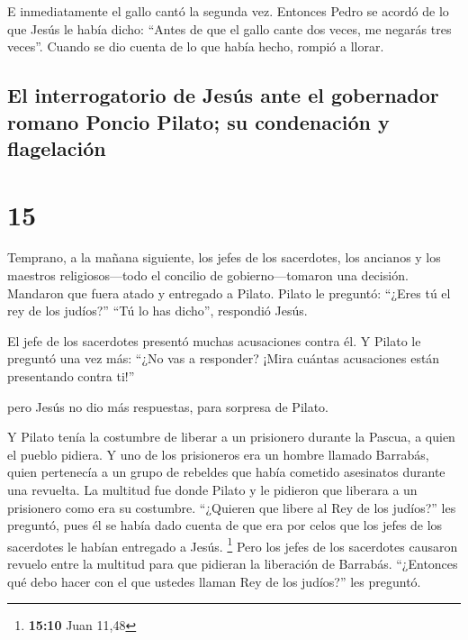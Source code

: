  E inmediatamente el gallo cantó la segunda vez. Entonces
Pedro se acordó de lo que Jesús le había dicho: ``Antes de que el gallo
cante dos veces, me negarás tres veces''. Cuando se dio cuenta de lo que
había hecho, rompió a llorar.

\hypertarget{el-interrogatorio-de-jesuxfas-ante-el-gobernador-romano-poncio-pilato-su-condenaciuxf3n-y-flagelaciuxf3n}{%
\subsection{El interrogatorio de Jesús ante el gobernador romano Poncio
Pilato; su condenación y
flagelación}\label{el-interrogatorio-de-jesuxfas-ante-el-gobernador-romano-poncio-pilato-su-condenaciuxf3n-y-flagelaciuxf3n}}

\hypertarget{section-14}{%
\section{15}\label{section-14}}

 Temprano, a la mañana siguiente, los jefes de los
sacerdotes, los ancianos y los maestros religiosos---todo el concilio de
gobierno---tomaron una decisión. Mandaron que fuera atado y entregado a
Pilato.  Pilato le preguntó: ``¿Eres tú el rey de los
judíos?'' ``Tú lo has dicho'', respondió Jesús.

 El jefe de los sacerdotes presentó muchas acusaciones
contra él.  Y Pilato le preguntó una vez más: ``¿No vas a
responder? ¡Mira cuántas acusaciones están presentando contra ti!''

 pero Jesús no dio más respuestas, para sorpresa de
Pilato.

 Y Pilato tenía la costumbre de liberar a un prisionero
durante la Pascua, a quien el pueblo pidiera.  Y uno de
los prisioneros era un hombre llamado Barrabás, quien pertenecía a un
grupo de rebeldes que había cometido asesinatos durante una revuelta.
 La multitud fue donde Pilato y le pidieron que liberara a
un prisionero como era su costumbre.  ``¿Quieren que
libere al Rey de los judíos?'' les preguntó,  pues él se
había dado cuenta de que era por celos que los jefes de los sacerdotes
le habían entregado a Jesús. \footnote{\textbf{15:10} Juan 11,48}
 Pero los jefes de los sacerdotes causaron revuelo entre
la multitud para que pidieran la liberación de Barrabás. 
``¿Entonces qué debo hacer con el que ustedes llaman Rey de los
judíos?'' les preguntó.

